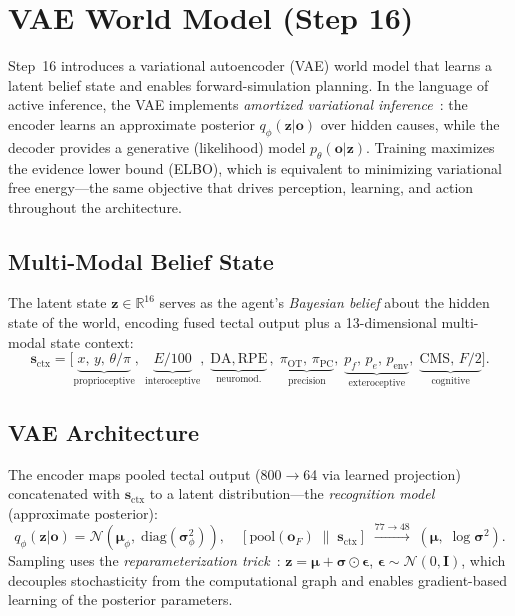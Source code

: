 \documentclass[11pt,a4paper]{article}
\begin{document}
\section{VAE World Model (Step 16)}\label{sec:vae}

Step~16 introduces a variational autoencoder (VAE) world model that learns a
latent belief state and enables forward-simulation planning.
In the language of active inference, the VAE implements \emph{amortized
variational inference}~\cite{kingma2014}: the encoder learns an approximate
posterior $q_\phi(\mathbf{z}|\mathbf{o})$ over hidden causes, while the
decoder provides a generative (likelihood) model $p_\theta(\mathbf{o}|\mathbf{z})$.
Training maximizes the evidence lower bound (ELBO), which is equivalent to
minimizing variational free energy---the same objective that drives
perception, learning, and action throughout the architecture.

\subsection{Multi-Modal Belief State}

The latent state $\mathbf{z} \in \mathbb{R}^{16}$ serves as the agent's
\emph{Bayesian belief} about the hidden state of the world, encoding fused
tectal output plus a 13-dimensional multi-modal state context:
\begin{equation}\label{eq:state_ctx}
\mathbf{s}_\text{ctx} = \bigl[
  \underbrace{x,\, y,\, \theta/\pi}_\text{proprioceptive},\;
  \underbrace{E/100}_\text{interoceptive},\;
  \underbrace{\text{DA},\, \text{RPE}}_\text{neuromod.},\;
  \underbrace{\pi_\text{OT},\, \pi_\text{PC}}_\text{precision},\;
  \underbrace{p_f,\, p_e,\, p_\text{env}}_\text{exteroceptive},\;
  \underbrace{\text{CMS},\, F/2}_\text{cognitive}
\bigr].
\end{equation}

\subsection{VAE Architecture}

The encoder maps pooled tectal output (800$\to$64 via learned projection)
concatenated with $\mathbf{s}_\text{ctx}$ to a latent distribution---the
\emph{recognition model} (approximate posterior):
\begin{equation}\label{eq:vae_enc}
  q_\phi(\mathbf{z}|\mathbf{o}) = \mathcal{N}(\boldsymbol{\mu}_\phi,\;
    \text{diag}(\boldsymbol{\sigma}_\phi^2)),
  \quad
  [\text{pool}(\mathbf{o}_F)\;\|\;\mathbf{s}_\text{ctx}]
  \;\xrightarrow{77 \to 48}\;
  (\boldsymbol{\mu},\; \log\boldsymbol{\sigma}^2).
\end{equation}
Sampling uses the \emph{reparameterization trick}~\cite{kingma2014}:
$\mathbf{z} = \boldsymbol{\mu} + \boldsymbol{\sigma}\odot\boldsymbol{\epsilon}$,
$\boldsymbol{\epsilon} \sim \mathcal{N}(0, \mathbf{I})$,
which decouples stochasticity from the computational graph and enables
gradient-based learning of the posterior parameters.
\end{document}
